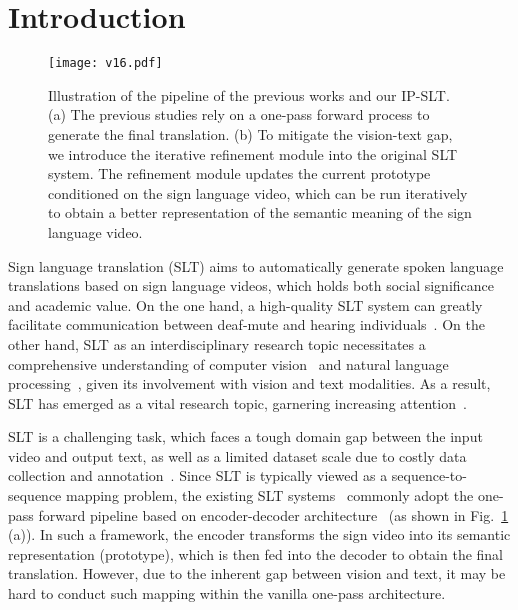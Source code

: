 \documentclass[10pt,twocolumn,letterpaper]{article}
\begin{document}
\section{Introduction}
\begin{figure}
\centering
\texttt{[image: v16.pdf]}
\caption{Illustration of the pipeline of the previous works and our IP-SLT. (a) The previous studies rely on a one-pass forward process to generate the final translation. (b) To mitigate the vision-text gap, we introduce the iterative refinement module into the original SLT system. The refinement module updates the current prototype conditioned on the sign language video, which can be run iteratively to obtain a better representation of the semantic meaning of the sign language video.
}
\label{fig1}
\end{figure}

Sign language translation (SLT) aims to automatically generate spoken language translations based on sign language videos, which holds both social significance and academic value. On the one hand, a high-quality SLT system can greatly facilitate communication between deaf-mute and hearing individuals~\cite{bragg2019sign,cooper2011sign,cormier2019extol,sutton1999linguistics}. On the other hand, SLT as an interdisciplinary research topic necessitates a comprehensive understanding of computer vision~\cite{min2021visual, cui2017recurrent, pu2019iterative,he2022revisiting} and natural language processing~\cite{vaswani2017attention, sutskever2014sequence}, given its involvement with vision and text modalities. As a result, SLT has emerged as a vital research topic, garnering increasing attention~\cite{camgoz2018neural,zhou2021improving,min2021visual,albanie2020bsl,huang2018video,hu2023signbert+,tang2021graph}.


SLT is a challenging task, which faces a tough domain gap between the input video and output text, as well as a limited dataset scale due to costly data collection and annotation~\cite{zhou2021improving,camgoz2020sign,wang2016isolated, huang2018video}. Since SLT is typically viewed as a sequence-to-sequence mapping problem, the existing SLT systems~\cite{jin2022prior,camgoz2018neural,camgoz2020sign} commonly adopt the one-pass forward pipeline based on encoder-decoder architecture~\cite{sutskever2014sequence,luong2015effective} (as shown in Fig.~\ref{fig1} (a)). 
In such a framework, the encoder transforms the sign video into its semantic representation (prototype), which is then fed into the decoder to obtain the final translation. 
However, due to the inherent gap between vision and text, it may be hard to conduct such mapping within the vanilla one-pass architecture.
\end{document}
